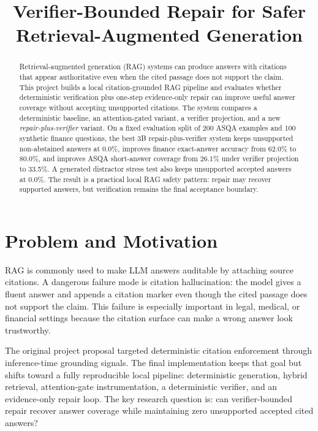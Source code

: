 \documentclass[conference]{IEEEtran}
\title{Verifier-Bounded Repair for Safer Retrieval-Augmented Generation}
\author{
\IEEEauthorblockN{Mehmet Can Özen}
\IEEEauthorblockA{Student ID: 20210808020\\
Large Language Models Course Project\\
GitHub: \url{https://github.com/mehmetcanozen/llmtermproject}}
}
\begin{document}
\maketitle

\begin{abstract}
Retrieval-augmented generation (RAG) systems can produce answers with citations that appear authoritative even when the cited passage does not support the claim. This project builds a local citation-grounded RAG pipeline and evaluates whether deterministic verification plus one-step evidence-only repair can improve useful answer coverage without accepting unsupported citations. The system compares a deterministic baseline, an attention-gated variant, a verifier projection, and a new \textit{repair-plus-verifier} variant. On a fixed evaluation split of 200 ASQA examples and 100 synthetic finance questions, the best 3B repair-plus-verifier system keeps unsupported non-abstained answers at 0.0\%, improves finance exact-answer accuracy from 62.0\% to 80.0\%, and improves ASQA short-answer coverage from 26.1\% under verifier projection to 33.5\%. A generated distractor stress test also keeps unsupported accepted answers at 0.0\%. The result is a practical local RAG safety pattern: repair may recover supported answers, but verification remains the final acceptance boundary.
\end{abstract}

\section{Problem and Motivation}
RAG is commonly used to make LLM answers auditable by attaching source citations. A dangerous failure mode is citation hallucination: the model gives a fluent answer and appends a citation marker even though the cited passage does not support the claim. This failure is especially important in legal, medical, or financial settings because the citation surface can make a wrong answer look trustworthy.

The original project proposal targeted deterministic citation enforcement through inference-time grounding signals. The final implementation keeps that goal but shifts toward a fully reproducible local pipeline: deterministic generation, hybrid retrieval, attention-gate instrumentation, a deterministic verifier, and an evidence-only repair loop. The key research question is: can verifier-bounded repair recover answer coverage while maintaining zero unsupported accepted cited answers?
\end{document}
